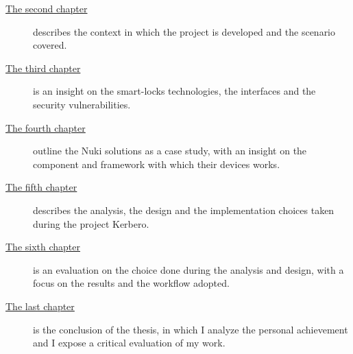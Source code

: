 \begin{description}
    \item[{\hyperref[cap:one]{The second chapter}}] describes the context in which the project is developed and the scenario covered.
    
    \item[{\hyperref[cap:two]{The third chapter}}] is an insight on the smart-locks technologies, the interfaces and the security vulnerabilities.

    \item[{\hyperref[cap:three]{The fourth chapter}}] outline the Nuki solutions as a case study, with an insight on the component and framework with which their devices works.
    
    \item[{\hyperref[cap:four]{The fifth chapter}}] describes the analysis, the design and the implementation choices taken during the project Kerbero.

    \item[{\hyperref[cap:five]{The sixth chapter}}] is an evaluation on the choice done during the analysis and design, with a focus on the results and the workflow adopted.

    \item[{\hyperref[cap:conclusion]{The last chapter}}] is the conclusion of the thesis, in which I analyze the personal achievement and I expose a critical evaluation of my work.
\end{description}
